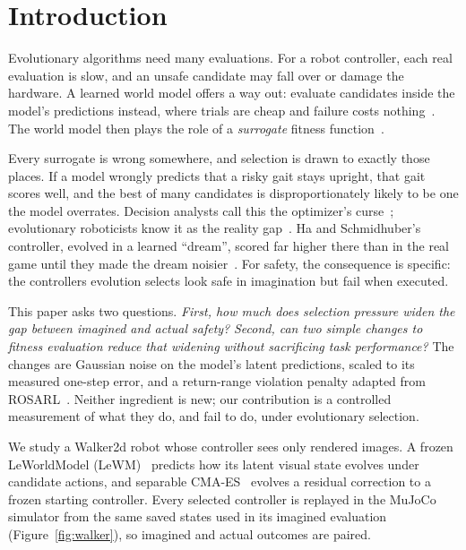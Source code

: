 \documentclass[sigconf,dvipsnames]{acmart}
\newcommand{\rosarl}{ROSARL}
\begin{document}

\maketitle

\section{Introduction}
\label{sec:intro}

Evolutionary algorithms need many evaluations. For a robot controller, each
real evaluation is slow, and an unsafe candidate may fall over or damage the
hardware. A learned world model offers a way out: evaluate candidates inside
the model's predictions instead, where trials are cheap and failure costs
nothing~\cite{ha2018worldmodels}. The world model then plays the role of a
\emph{surrogate} fitness function~\cite{jin2011surrogate}.

Every surrogate is wrong somewhere, and selection is drawn to exactly those
places. If a model wrongly predicts that a risky gait stays upright, that gait
scores well, and the best of many candidates is disproportionately likely to be
one the model overrates. Decision analysts call this the optimizer's
curse~\cite{smith2006optimizer}; evolutionary roboticists know it as the reality
gap~\cite{jakobi1995noise,koos2013transferability}. Ha and Schmidhuber's
controller, evolved in a learned ``dream'', scored far higher there than in the
real game until they made the dream noisier~\cite{ha2018worldmodels}. For safety,
the consequence is specific: the controllers evolution selects look safe in
imagination but fail when executed.

This paper asks two questions. \emph{First, how much does selection pressure
widen the gap between imagined and actual safety?} \emph{Second, can two simple
changes to fitness evaluation reduce that widening without sacrificing task
performance?} The changes are Gaussian noise on the model's latent predictions,
scaled to its measured one-step error, and a return-range violation penalty
adapted from \rosarl{}~\cite{tasse2026simple}. Neither ingredient is new; our
contribution is a controlled measurement of what they do, and fail to do, under
evolutionary selection.

We study a Walker2d robot whose controller sees only rendered images. A frozen
LeWorldModel (LeWM)~\cite{maes2026lewm} predicts how its latent visual state
evolves under candidate actions, and separable CMA-ES~\cite{ros2008sep} evolves
a residual correction to a frozen starting controller. Every selected
controller is replayed in the MuJoCo simulator from the same saved states used
in its imagined evaluation (Figure~\ref{fig:walker}), so imagined and actual
outcomes are paired.
\end{document}
